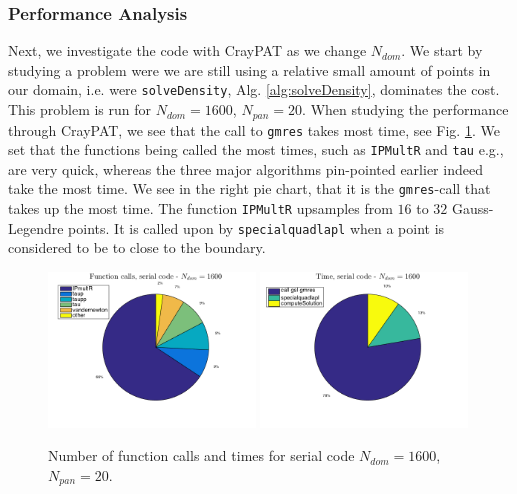 \documentclass[a4paper,10pt]{article}
\def\code#1{\texttt{#1}}
\begin{document}
\subsubsection*{Performance Analysis}
Next, we investigate the code with CrayPAT as we change $N_{dom}$. We start by studying a problem were we are still using a relative small amount of points in our domain, i.e. were \texttt{solveDensity}, Alg. \ref{alg:solveDensity}, dominates the cost. This problem is run for $N_{dom} = 1600$, $N_{pan}=20$. When studying the performance through CrayPAT, we see that the call to \texttt{gmres} takes most time, see Fig. \ref{fig:batch4_serial_pie}. We set that the functions being called the most times, such as \texttt{IPMultR} and \texttt{tau} e.g., are very quick, whereas the three major algorithms pin-pointed earlier indeed take the most time. We see in the right pie chart, that it is the \texttt{gmres}-call that takes up the most time. The function \texttt{IPMultR} upsamples from $16$ to $32$ Gauss-Legendre points. It is called upon by \code{specialquadlapl} when a point is considered to be to close to the boundary. 
\begin{figure}[ht]
    \begin{center}
        \includegraphics[width=0.49\textwidth]{Graphics/craypat_serial_batch4_calls_pie.png}
        \includegraphics[width=0.49\textwidth]{Graphics/craypat_serial_batch4_time_pie.png}
    \end{center}
    \caption{Number of function calls and times for serial code $N_{dom} = 1600$, $N_{pan} = 20$.}
    \label{fig:batch4_serial_pie}
\end{figure}
\end{document}
